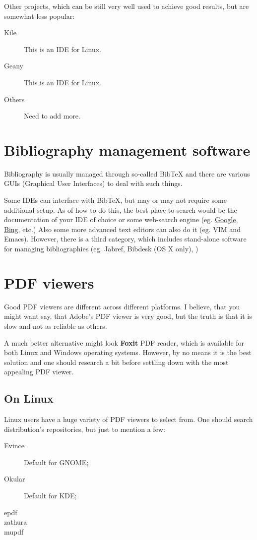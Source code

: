 \documentclass[a4paper]{article}
\begin{document}
Other projects, which can be still very well used to achieve good results, but
are somewhat less popular:
\begin{description}
    \item[Kile] This is an IDE for Linux.
    \item[Geany] This is an IDE for Linux.
    \item[Others] Need to add more.
\end{description}

\section{Bibliography management software}

Bibliography is usually managed through so-called Bib\TeX{} and there are various
GUIs (Graphical User Interfaces) to deal with such things. 

Some IDEs can interface with Bib\TeX{}, but may or may not require some additional
setup. As of how to do this, the best place to search would be the documentation
of your IDE of choice or some web-search engine (eg.
\href{http://www.google.co.uk}{Google}, \href{http://www.bing.co.uk}{Bing},
etc.)
Also some more advanced text editors can also do it (eg. VIM and Emacs).
However, there is a third category, which includes stand-alone software for
managing bibliographies (eg. Jabref, Bibdesk (OS X only), )

\section{PDF viewers}

Good PDF viewers are different across different platforms. I believe, that you
might want say, that Adobe's PDF viewer is very good, but the truth is that it
is slow and not as reliable as others.

A much better alternative might look \textbf{Foxit} PDF reader, which is
available for both Linux and Windows operating systems. However, by no means it
is the best solution and one should research a bit before settling down with the
most appealing PDF viewer.

\subsection{On Linux}

Linux users have a huge variety of PDF viewers to select from. One should search
distribution's repositories, but just to mention a few:
\begin{description}
    \item[Evince] Default for GNOME;
    \item[Okular] Default for KDE;
    \item[epdf]
    \item[zathura]
    \item[mupdf]
\end{description}
\end{document}
